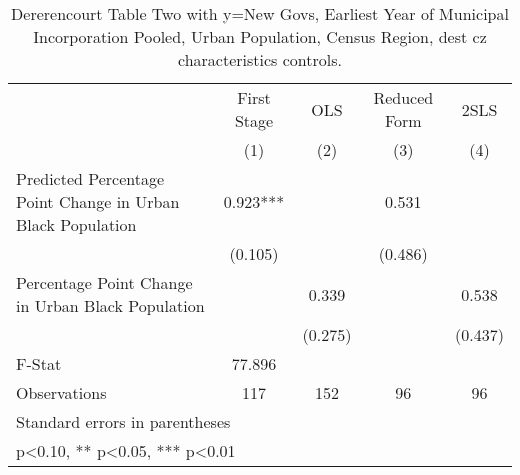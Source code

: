 \begin{table}[htbp]\centering
\def\sym#1{\ifmmode^{#1}\else\(^{#1}\)\fi}
\caption{Dererencourt Table Two with y=New Govs, Earliest Year of Municipal Incorporation  Pooled, Urban Population, Census Region, dest cz characteristics controls.}
\begin{tabular}{l*{4}{c}}
\toprule
                    & First Stage   &         OLS   &Reduced Form   &        2SLS   \\
                    &\multicolumn{1}{c}{(1)}   &\multicolumn{1}{c}{(2)}   &\multicolumn{1}{c}{(3)}   &\multicolumn{1}{c}{(4)}   \\
\midrule
Predicted Percentage Point Change in Urban Black Population&       0.923***&               &       0.531   &               \\
                    &     (0.105)   &               &     (0.486)   &               \\
\addlinespace
Percentage Point Change in Urban Black Population&               &       0.339   &               &       0.538   \\
                    &               &     (0.275)   &               &     (0.437)   \\
\midrule
F-Stat              &      77.896   &               &               &               \\
Observations        &         117   &         152   &          96   &          96   \\
\bottomrule
\multicolumn{5}{l}{\footnotesize Standard errors in parentheses}\\
\multicolumn{5}{l}{\footnotesize * p<0.10, ** p<0.05, *** p<0.01}\\
\end{tabular}
\end{table}
